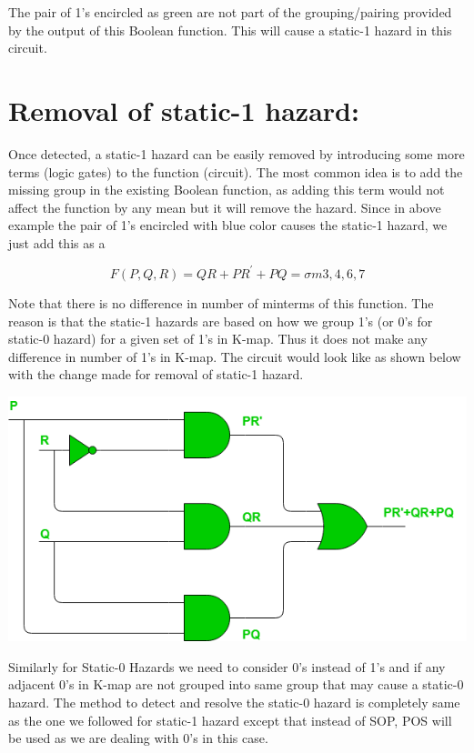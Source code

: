 \documentclass[12pt]{article}
\begin{document}
The pair of 1’s encircled as green are not part of the grouping/pairing provided by the output of this Boolean function. This will cause a static-1 hazard in this circuit.

\section{Removal of static-1 hazard:}


Once detected, a static-1 hazard can be easily removed by introducing some more terms (logic gates) to the function (circuit). The most common idea is to add the missing group in the existing Boolean function, as adding this term would not affect the function by any mean but it will remove the hazard. Since in above example the pair of 1’s encircled with blue color causes the static-1 hazard, we just add this as a

$$
F(P,Q,R) = QR + PR^{\prime} + PQ = \sigma{m{3,4,6,7}}
$$


Note that there is no difference in number of minterms of this function. The reason is that the static-1 hazards are based on how we group 1’s (or 0’s for static-0 hazard) for a given set of 1’s in K-map. Thus it does not make any difference in number of 1’s in K-map. The circuit would look like as shown below with the change made for removal of static-1 hazard.



\begin{center}
	\includegraphics[scale=0.6]{./6666.png}
\end{center}


Similarly for Static-0 Hazards we need to consider 0’s instead of 1’s and if any adjacent 0’s in K-map are not grouped into same group that may cause a static-0 hazard. The method to detect and resolve the static-0 hazard is completely same as the one we followed for static-1 hazard except that instead of SOP, POS will be used as we are dealing with 0’s in this case.
\end{document}
